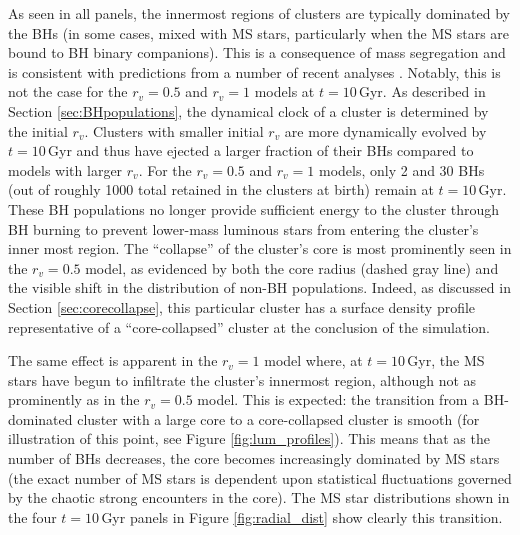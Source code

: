 \documentclass[twocolumn,tighten]{aastex63}
\begin{document}
As seen in all panels, the innermost regions of clusters are typically dominated by the BHs (in some cases, mixed with MS stars, particularly when the MS stars are bound to BH binary companions). 
This is a consequence of mass segregation and is consistent with predictions from a number of recent analyses \citep[e.g.][]{Kulkarni1993,Sigurdsson1993,BreenHeggie2013,Morscher2015,Chatterjee2017a,Askar2018,Kremer2019a}. Notably, this is not the case for the $r_v=0.5$ and $r_v=1$ models at $t=10\,$Gyr. As described in Section \ref{sec:BHpopulations}, the dynamical clock of a cluster is determined by the initial $r_v$. Clusters with smaller initial $r_v$ are more dynamically evolved by $t=10\,$Gyr and thus have ejected a larger fraction of their BHs compared to models with larger $r_v$. For the $r_v=0.5$ and $r_v=1$ models, only 2 and 30 BHs (out of roughly 1000 total retained in the clusters at birth) remain at $t=10\,$Gyr. These BH populations no longer provide sufficient energy to the cluster through BH burning to prevent lower-mass luminous stars from entering the cluster's inner most region. The ``collapse'' of the cluster's core is most prominently seen in the $r_v=0.5$ model, as evidenced by both the core radius (dashed gray line) and the visible shift in the distribution of non-BH populations. Indeed, as discussed in Section \ref{sec:corecollapse}, this particular cluster has a surface density profile representative of a ``core-collapsed'' cluster at the conclusion of the simulation.

The same effect is apparent in the $r_v=1$ model where, at $t=10\,$Gyr, the MS stars have begun to infiltrate the cluster's innermost region, although not as prominently as in the $r_v=0.5$ model. This is expected: the transition from a BH-dominated cluster with a large core to a core-collapsed cluster is smooth (for illustration of this point, see Figure \ref{fig:lum_profiles}). This means that as the number of BHs decreases, the core becomes increasingly dominated by MS stars (the exact number of MS stars is dependent upon statistical fluctuations governed by the chaotic strong encounters in the core).
The MS star distributions shown in the four $t=10\,$Gyr panels in Figure \ref{fig:radial_dist} show clearly this transition.
\end{document}
